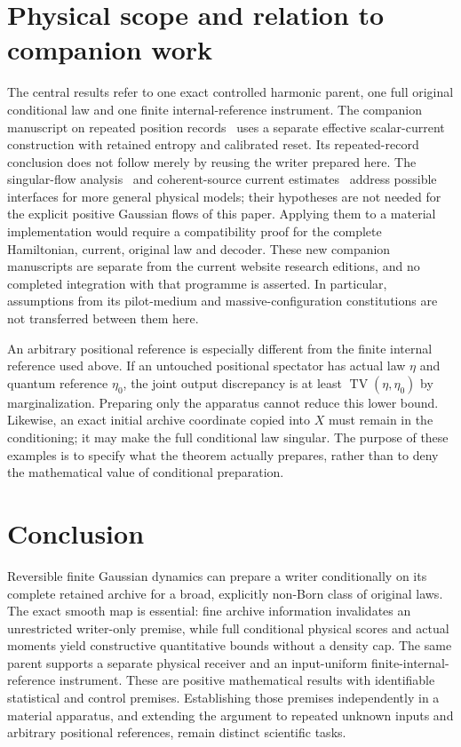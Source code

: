 \documentclass[11pt]{article}
\numberwithin{equation}{section}
\theoremstyle{definition}
\theoremstyle{remark}
\newcommand{\TV}{\operatorname{TV}}
\begin{document}
\section{Physical scope and relation to companion work}\label{app:scope}
The central results refer to one exact controlled harmonic parent, one full original conditional law and one finite internal-reference instrument. The companion manuscript on repeated position records~\cite{RodgersP2} uses a separate effective scalar-current construction with retained entropy and calibrated reset. Its repeated-record conclusion does not follow merely by reusing the writer prepared here. The singular-flow analysis~\cite{RodgersP3} and coherent-source current estimates~\cite{RodgersP4} address possible interfaces for more general physical models; their hypotheses are not needed for the explicit positive Gaussian flows of this paper. Applying them to a material implementation would require a compatibility proof for the complete Hamiltonian, current, original law and decoder. These new companion manuscripts are separate from the current website research editions, and no completed integration with that programme is asserted. In particular, assumptions from its pilot-medium and massive-configuration constitutions are not transferred between them here.

An arbitrary positional reference is especially different from the finite internal reference used above. If an untouched positional spectator has actual law $\eta$ and quantum reference $\eta_0$, the joint output discrepancy is at least $\TV(\eta,\eta_0)$ by marginalization. Preparing only the apparatus cannot reduce this lower bound. Likewise, an exact initial archive coordinate copied into $X$ must remain in the conditioning; it may make the full conditional law singular. The purpose of these examples is to specify what the theorem actually prepares, rather than to deny the mathematical value of conditional preparation.

\section*{Conclusion}
Reversible finite Gaussian dynamics can prepare a writer conditionally on its complete retained archive for a broad, explicitly non-Born class of original laws. The exact smooth map is essential: fine archive information invalidates an unrestricted writer-only premise, while full conditional physical scores and actual moments yield constructive quantitative bounds without a density cap. The same parent supports a separate physical receiver and an input-uniform finite-internal-reference instrument. These are positive mathematical results with identifiable statistical and control premises. Establishing those premises independently in a material apparatus, and extending the argument to repeated unknown inputs and arbitrary positional references, remain distinct scientific tasks.
\end{document}
